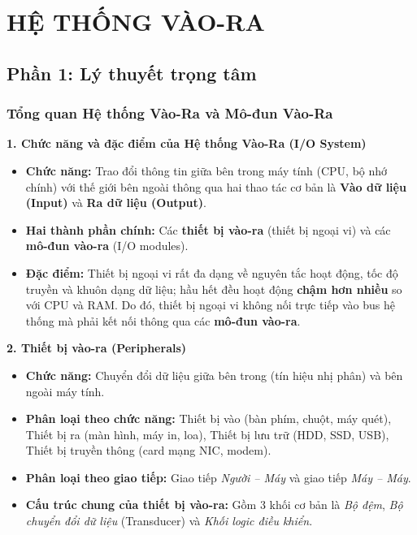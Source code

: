 \chapter{HỆ THỐNG VÀO-RA}

\section{Phần 1: Lý thuyết trọng tâm}

\subsection{Tổng quan Hệ thống Vào-Ra và Mô-đun Vào-Ra}

\textbf{1. Chức năng và đặc điểm của Hệ thống Vào-Ra (I/O System)}
\begin{itemize}
    \item \textbf{Chức năng:} Trao đổi thông tin giữa bên trong máy tính (CPU, bộ nhớ chính) với thế giới bên ngoài thông qua hai thao tác cơ bản là \textbf{Vào dữ liệu (Input)} và \textbf{Ra dữ liệu (Output)}.
    \item \textbf{Hai thành phần chính:} Các \textbf{thiết bị vào-ra} (thiết bị ngoại vi) và các \textbf{mô-đun vào-ra} (I/O modules).
    \item \textbf{Đặc điểm:} Thiết bị ngoại vi rất đa dạng về nguyên tắc hoạt động, tốc độ truyền và khuôn dạng dữ liệu; hầu hết đều hoạt động \textbf{chậm hơn nhiều} so với CPU và RAM. Do đó, thiết bị ngoại vi không nối trực tiếp vào bus hệ thống mà phải kết nối thông qua các \textbf{mô-đun vào-ra}.
\end{itemize}

\textbf{2. Thiết bị vào-ra (Peripherals)}
\begin{itemize}
    \item \textbf{Chức năng:} Chuyển đổi dữ liệu giữa bên trong (tín hiệu nhị phân) và bên ngoài máy tính.
    \item \textbf{Phân loại theo chức năng:} Thiết bị vào (bàn phím, chuột, máy quét), Thiết bị ra (màn hình, máy in, loa), Thiết bị lưu trữ (HDD, SSD, USB), Thiết bị truyền thông (card mạng NIC, modem).
    \item \textbf{Phân loại theo giao tiếp:} Giao tiếp \textit{Người -- Máy} và giao tiếp \textit{Máy -- Máy}.
    \item \textbf{Cấu trúc chung của thiết bị vào-ra:} Gồm 3 khối cơ bản là \textit{Bộ đệm}, \textit{Bộ chuyển đổi dữ liệu} (Transducer) và \textit{Khối logic điều khiển}.
\end{itemize}

